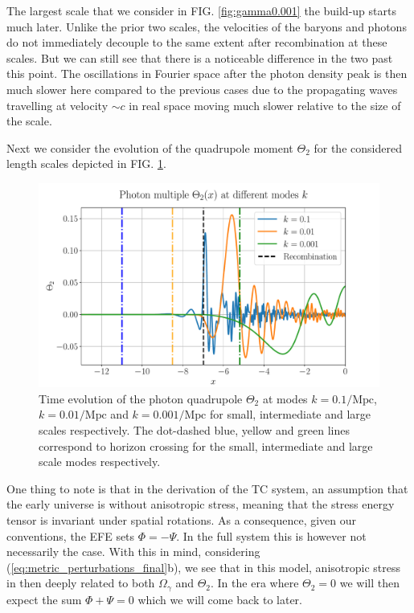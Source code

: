 \documentclass[%
reprint,
 amsmath,amssymb,
 aps,
]{revtex4-2}
\begin{document}
The largest scale that we consider in FIG. \ref{fig:gamma0.001} the build-up starts much later. Unlike the prior two scales, the velocities of the baryons and photons do not immediately decouple to the same extent after recombination at these scales. But we can still see that there is a noticeable difference in the two past this point. The oscillations in Fourier space after the photon density peak is then much slower here compared to the previous cases due to the propagating waves travelling at velocity $\sim c$ in real space moving much slower relative to the size of the scale.

Next we consider the evolution of the quadrupole moment $\Theta_2$ for the considered length scales depicted in FIG. \ref{fig:T2}.

\begin{figure}[ht!]
	\includegraphics[width = \linewidth]{Figures/Theta2.pdf}
	\caption{Time evolution of the photon quadrupole $\Theta_2$ at modes $k=0.1/\text{Mpc}$, $k=0.01/\text{Mpc}$ and $k=0.001/\text{Mpc}$ for small, intermediate and large scales respectively. The dot-dashed blue, yellow and green lines correspond to horizon crossing for the small, intermediate and large scale modes respectively.}
	\label{fig:T2}
\end{figure}

One thing to note is that in the derivation of the TC system, an assumption that the early universe is without anisotropic stress, meaning that the stress energy tensor is invariant under spatial rotations. As a consequence, given our conventions, the EFE sets $\Phi=-\Psi$. In the full system this is however not necessarily the case. With this in mind, considering (\ref{eq:metric_perturbations_final}b), we see that in this model, anisotropic stress in then deeply related to both $\Omega_\gamma$ and $\Theta_2$. In the era where $\Theta_2=0$ we will then expect the sum $\Phi+\Psi=0$ which we will come back to later. 
\end{document}
